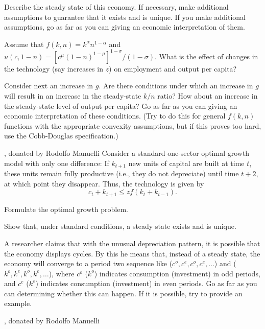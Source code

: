  Describe the steady state of this economy.  If necessary,
make additional assumptions to guarantee that it exists and is unique.
If you make additional assumptions, go as far as you can giving an
economic interpretation of them.
\medskip

 Assume that $f(k,n) = k^\alpha n^{1-\alpha}$
and {\ninepoint $u(c,1-n) = [c^\mu (1-n)^{1-\mu}]^{1-\sigma}/(1-\sigma)$.}
What is the effect of changes in the technology (say increases in $z$)
on employment and output per capita?
\medskip

 Consider next an increase in $g$.  Are there
conditions under which an increase in $g$ will result in an
increase in the steady-state $k/n$ ratio?  How about an increase
in the steady-state level of output per capita?  Go as far as you
can giving an economic interpretation of these conditions.  (Try to
do this for general $f(k,n)$ functions with the appropriate
convexity assumptions, but if this proves too hard, use the
Cobb-Douglas specification.)

\medskip
{} ,
 donated by Rodolfo Manuelli
\medskip\noindent
Consider a standard one-sector optimal growth model with only one
difference:
If $k_{t+1}$ new units of capital are built at time $t$, these units remain
fully productive (i.e., they do not depreciate) until time $t+2$, at which
point they disappear.  Thus, the technology is given by
$$ c_t + k_{t+1} \leq zf(k_t + k_{t-1}). $$

 Formulate the optimal growth problem.
\medskip

 Show that, under standard conditions, a steady
state exists and is unique.
\medskip

 A researcher claims that with the unusual depreciation
pattern, it is possible that the economy displays cycles.  By
this he means that, instead of a steady state, the economy will
converge to a period two sequence like
($c^o, c^e, c^o, c^e, \ldots$) and
 ($k^o, k^e, k^o, k^e, \ldots$), where $c^o$ ($k^o$)
 indicates consumption (investment) in odd periods, and $c^e$ ($k^e$)
 indicates consumption (investment) in even periods.
Go as far as you can determining whether this can happen.
  If it is possible, try to provide an example.

\medskip
{}, donated by
Rodolfo Manuelli

